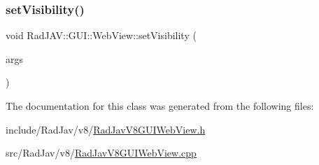 \mbox{\label{class_rad_j_a_v_1_1_g_u_i_1_1_web_view_a51eb589f71919a5077c6799fe118856b}} 
\subsubsection{\texorpdfstring{set\+Visibility()}{setVisibility()}}
{\footnotesize\ttfamily void Rad\+J\+A\+V\+::\+G\+U\+I\+::\+Web\+View\+::set\+Visibility (\begin{DoxyParamCaption}\item[{const v8\+::\+Function\+Callback\+Info$<$ v8\+::\+Value $>$ \&}]{args }\end{DoxyParamCaption})\hspace{0.3cm}{\ttfamily [static]}}



The documentation for this class was generated from the following files\+:\begin{DoxyCompactItemize}
\item 
include/\+Rad\+Jav/v8/\mbox{\hyperlink{_rad_jav_v8_g_u_i_web_view_8h}{Rad\+Jav\+V8\+G\+U\+I\+Web\+View.\+h}}\item 
src/\+Rad\+Jav/v8/\mbox{\hyperlink{_rad_jav_v8_g_u_i_web_view_8cpp}{Rad\+Jav\+V8\+G\+U\+I\+Web\+View.\+cpp}}\end{DoxyCompactItemize}
